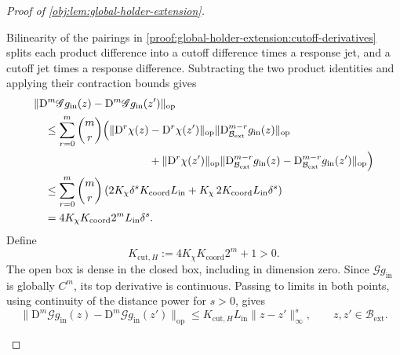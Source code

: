 \documentclass[11pt]{article}
\begin{document}
\begin{proof}[Proof of \cref{obj:lem:global-holder-extension}]
\begin{enumerate}
Bilinearity of the pairings in \cref{proof:global-holder-extension:cutoff-derivatives} splits each product difference into a cutoff difference times a response jet, and a cutoff jet times a response difference. Subtracting the two product identities and applying their contraction bounds gives
\[
\begin{aligned}
&\|\mathrm D^m\mathscr G g_{\mathrm{in}}(z)
-\mathrm D^m\mathscr G g_{\mathrm{in}}(z')\|_{\mathrm{op}}\\
&\quad\le
\sum_{r=0}^m\binom mr
\Bigl(
\|\mathrm D^r\chi(z)-\mathrm D^r\chi(z')\|_{\mathrm{op}}
\|\mathrm D_{\mathcal B_{\mathrm{ext}}}^{m-r}g_{\mathrm{in}}(z)\|_{\mathrm{op}}\\
&\hspace{105pt}
+\|\mathrm D^r\chi(z')\|_{\mathrm{op}}
\|\mathrm D_{\mathcal B_{\mathrm{ext}}}^{m-r}g_{\mathrm{in}}(z)
-\mathrm D_{\mathcal B_{\mathrm{ext}}}^{m-r}g_{\mathrm{in}}(z')\|_{\mathrm{op}}
\Bigr)\\
&\quad\le
\sum_{r=0}^m\binom mr
\left(
2K_\chi\delta^s K_{\mathrm{coord}}L_{\mathrm{in}}
+K_\chi\,2K_{\mathrm{coord}}L_{\mathrm{in}}\delta^s
\right)\\
&\quad=
4K_\chi K_{\mathrm{coord}}2^mL_{\mathrm{in}}\delta^s.
\end{aligned}
\]
Define
\[
K_{\mathrm{cut},H}:=4K_\chi K_{\mathrm{coord}}2^m+1>0.
\]
The open box is dense in the closed box, including in dimension zero. Since \(\mathscr G g_{\mathrm{in}}\) is globally \(C^m\), its top derivative is continuous. Passing to limits in both points, using continuity of the distance power for \(s>0\), gives
\[
\|\mathrm D^m\mathscr G g_{\mathrm{in}}(z)
-\mathrm D^m\mathscr G g_{\mathrm{in}}(z')\|_{\mathrm{op}}
\le K_{\mathrm{cut},H}L_{\mathrm{in}}\|z-z'\|_\infty^s,
\qquad z,z'\in\mathcal B_{\mathrm{ext}}.
\]


\end{enumerate}
\end{proof}
\end{document}
